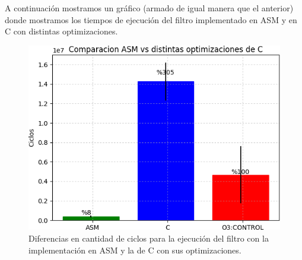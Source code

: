 \par{A continuación mostramos un gráfico (armado de igual manera que el anterior) donde mostramos los tiempos de ejecución del filtro implementado en ASM y en C con distintas optimizaciones.}
	
\begin{figure}[H]
\centering
\captionsetup{justification=centering}
\includegraphics[width = 12 cm, height = 7 cm]{imagenes/ASMvsCRotar.png}
\caption[center]{Diferencias en cantidad de ciclos para la ejecución del filtro con la implementación en ASM y la de C con sus optimizaciones.}
\end{figure}